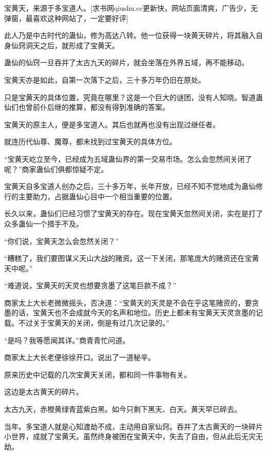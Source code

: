 
\begin{this_body}

宝黄天，来源于多宝道人。[求书网qiushu.cc更新快，网站页面清爽，广告少，无弹窗，最喜欢这种网站了，一定要好评]

此人乃是中古时代的蛊仙，修为高达八转。他一位获得一块黄天碎片，将其融入自身仙窍洞天之后，就形成了宝黄天。

蛊仙的仙窍一旦吞并了太古九天的碎片，就会坐落在外界五域，再不能移动。

宝黄天亦是如此，自第一次落下之后，三十多万年仍旧在原处。

只是宝黄天的具体位置，究竟在哪里？这是一个巨大的谜团，没有人知晓。智道蛊仙们也曾前仆后继的推算，都没有得到准确的答案。

宝黄天的原主人，便是多宝道人。其后也就再也没有出现过继任者。

就连历代仙尊、魔尊，都未找到过宝黄天的具体方位。

“宝黄天屹立至今，已经成为五域蛊仙界的第一交易市场。怎么会忽然间关闭了呢？”商家蛊仙们俱都惊疑不定。

宝黄天自多宝道人创办之后，三十多万年，长年开放，已经不知不觉地成为蛊仙修行的主要助力，占据蛊仙心目中一个相当重要的位置。

长久以来，蛊仙们已经习惯了宝黄天的存在。现在宝黄天忽然间关闭，实在是打了众多蛊仙一个措手不及。

“你们说，宝黄天怎么会忽然关闭？”

“糟糕了，我们要图谋义天山大战的赌资。这一下关闭，那笔庞大的赌资还在宝黄天中呢。”

“难道说，宝黄天的天灵也想要贪墨了这笔巨款不成？”

商家太上大长老微微摇头，否决道：“宝黄天的天灵是不会在乎这笔赌资的，要贪墨的话，宝黄天也不会成就今天的名声和地位。历史上都未有宝黄天天灵贪墨的记载。不过关于宝黄天的关闭，倒是有过几次记录的。”

“是吗？我等愿闻其详。”商青青忙问道。

商家太上大长老便徐徐开口。说出了一道秘辛。

原来历史中记载的几次宝黄天关闭，都和同一件事物有关。

这边是太古黄天的碎片。

太古九天，赤橙黄绿青蓝紫白黑。如今只剩下黑天、白天。黄天早已碎去。

当年。多宝道人就是心知渡劫不成，主动用自家仙窍。吞并了太古黄天的一块碎片小世界，成就了宝黄天。虽然终身被困在宝黄天中，失去了自由，但从此后无灾无劫。


\end{this_body}
